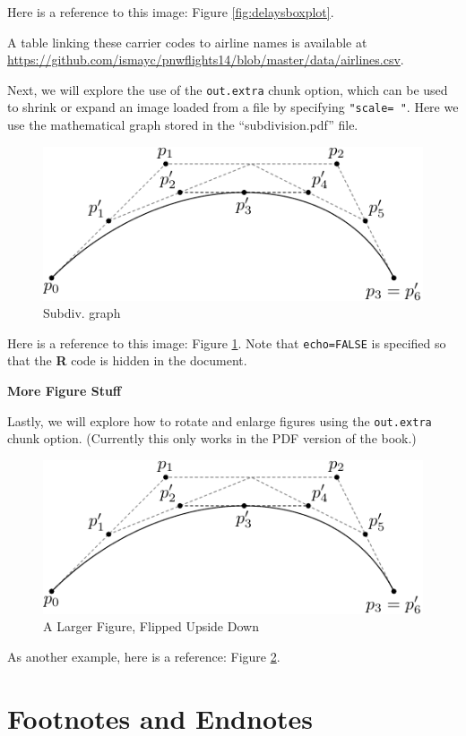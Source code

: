 \documentclass[12pt,twoside]{reedthesis}
\begin{document}
Here is a reference to this image: Figure \ref{fig:delaysboxplot}.

A table linking these carrier codes to airline names is available at \url{https://github.com/ismayc/pnwflights14/blob/master/data/airlines.csv}.

\clearpage

Next, we will explore the use of the \texttt{out.extra} chunk option, which can be used to shrink or expand an image loaded from a file by specifying \texttt{"scale=\ "}. Here we use the mathematical graph stored in the ``subdivision.pdf'' file.
\begin{figure}
\includegraphics[scale=0.75]{figure/subdivision} \caption{Subdiv. graph}\label{fig:subd}
\end{figure}
Here is a reference to this image: Figure \ref{fig:subd}. Note that \texttt{echo=FALSE} is specified so that the \textbf{R} code is hidden in the document.

\textbf{More Figure Stuff}

Lastly, we will explore how to rotate and enlarge figures using the \texttt{out.extra} chunk option. (Currently this only works in the PDF version of the book.)
\begin{figure}
\includegraphics[angle=180, scale=1.1]{figure/subdivision} \caption{A Larger Figure, Flipped Upside Down}\label{fig:subd2}
\end{figure}
As another example, here is a reference: Figure \ref{fig:subd2}.

\hypertarget{footnotes-and-endnotes}{%
\section{Footnotes and Endnotes}\label{footnotes-and-endnotes}}
\end{document}
